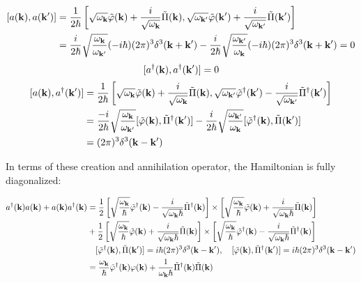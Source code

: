 \[\begin{split}
[a({\bf k}),a({\bf k'})] &= \frac{1}{2\hbar} \left[\sqrt{\omega_{\bf k}}\tilde\varphi({\bf k}) + \frac{i}{\sqrt{\omega_{\bf k}}}\tilde\Pi({\bf k}),\sqrt{\omega_{\bf k'}}\tilde\varphi({\bf k'}) + \frac{i}{\sqrt{\omega_{\bf k'}}}\tilde\Pi({\bf k'}) \right]\\
&=\frac{i}{2\hbar}\sqrt{\frac{{\omega_{\bf k}}}{{\omega_{\bf k'}}}}(-i\hbar)(2\pi)^3\delta^3({\bf k+k'}) - \frac{i}{2\hbar}\sqrt{\frac{{\omega_{\bf k'}}}{{\omega_{\bf k}}}}(-i\hbar)(2\pi)^3\delta^3({\bf k+k'}) = 0
\end{split}\]
\[[a^\dagger({\bf k}),a^\dagger({\bf k'})] = 0 \]
\[\begin{split}
[a({\bf k}),a^\dagger({\bf k'})]&= \frac{1}{2\hbar} \left[\sqrt{\omega_{\bf k}}\tilde\varphi({\bf k}) + \frac{i}{\sqrt{\omega_{\bf k}}}\tilde\Pi({\bf k}),\sqrt{\omega_{\bf k'}}\tilde\varphi^\dagger({\bf k'}) - \frac{i}{\sqrt{\omega_{\bf k'}}}\tilde\Pi^\dagger({\bf k'}) \right]\\
&=\frac{-i}{2\hbar}\sqrt{\frac{{\omega_{\bf k}}}{{\omega_{\bf k'}}}}[\tilde{\varphi}({\bf k}),\tilde{\Pi}^\dagger({\bf k'})] - \frac{i}{2\hbar}\sqrt{\frac{{\omega_{\bf k'}}}{{\omega_{\bf k}}}}[\tilde{\varphi}^\dagger({\bf k}),\tilde{\Pi}({\bf k'})]\\
&=(2\pi)^3\delta^3({\bf k-k'})
\end{split} \]

In terms of these creation and annihilation operator, the Hamiltonian is fully diagonalized:

\[\begin{split}
a^\dagger({\bf k})a({\bf k}) + a({\bf k})a^\dagger({\bf k})
&= \frac{1}{2}\left[\sqrt{\frac{\omega_{\bf k}}{\hbar}}\tilde\varphi^\dagger({\bf k}) - \frac{i}{\sqrt{\omega_{\bf k}\hbar}}\tilde\Pi^\dagger({\bf k})\right]\times\left[\sqrt{\frac{\omega_{\bf k}}{\hbar}}\tilde\varphi({\bf k}) + \frac{i}{\sqrt{\omega_{\bf k}\hbar}}\tilde\Pi({\bf k})\right]\\
& +\frac{1}{2}\left[\sqrt{\frac{\omega_{\bf k}}{\hbar}}\tilde\varphi({\bf k}) + \frac{i}{\sqrt{\omega_{\bf k}\hbar}}\tilde\Pi({\bf k})\right]\times\left[\sqrt{\frac{\omega_{\bf k}}{\hbar}}\tilde\varphi^\dagger({\bf k}) - \frac{i}{\sqrt{\omega_{\bf k}\hbar}}\tilde\Pi^\dagger({\bf k})\right]\\
&\quad [\tilde\varphi^\dagger({\bf k}),\tilde\Pi({\bf k'})] = i\hbar(2\pi)^3\delta^3({\bf k-k'}),\quad [\tilde\varphi({\bf k}),\tilde\Pi^\dagger({\bf k'})] = i\hbar(2\pi)^3\delta^3({\bf k-k'})\\
&=\frac{\omega_{\bf k}}{\hbar}\tilde\varphi^\dagger({\bf k})\varphi({\bf k}) + \frac{1}{\omega_{\bf k}\hbar}\tilde\Pi^\dagger({\bf k})\tilde\Pi({\bf k})
\end{split}\]

